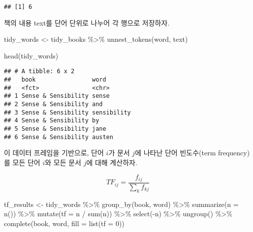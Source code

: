 \documentclass[
]{book}
\newenvironment{Shaded}{\begin{snugshade}}{\end{snugshade}}
\newcommand{\AttributeTok}[1]{\textcolor[rgb]{0.77,0.63,0.00}{#1}}
\newcommand{\DecValTok}[1]{\textcolor[rgb]{0.00,0.00,0.81}{#1}}
\newcommand{\FunctionTok}[1]{\textcolor[rgb]{0.00,0.00,0.00}{#1}}
\newcommand{\NormalTok}[1]{#1}
\newcommand{\OtherTok}[1]{\textcolor[rgb]{0.56,0.35,0.01}{#1}}
\newcommand{\SpecialCharTok}[1]{\textcolor[rgb]{0.00,0.00,0.00}{#1}}
\begin{document}
\begin{verbatim}
## [1] 6
\end{verbatim}

책의 내용 text를 단어 단위로 나누어 각 행으로 저장하자.

\begin{Shaded}
\begin{Highlighting}[]
\NormalTok{tidy\_words }\OtherTok{\textless{}{-}}\NormalTok{ tidy\_books }\SpecialCharTok{\%\textgreater{}\%} \FunctionTok{unnest\_tokens}\NormalTok{(word, text)}
  
\FunctionTok{head}\NormalTok{(tidy\_words)}
\end{Highlighting}
\end{Shaded}

\begin{verbatim}
## # A tibble: 6 x 2
##   book                word       
##   <fct>               <chr>      
## 1 Sense & Sensibility sense      
## 2 Sense & Sensibility and        
## 3 Sense & Sensibility sensibility
## 4 Sense & Sensibility by         
## 5 Sense & Sensibility jane       
## 6 Sense & Sensibility austen
\end{verbatim}

이 데이터 프레임을 기반으로, 단어 \(i\)가 문서 \(j\)에 나타난 단어 빈도수(term frequency)를 모든 단어 \(i\)와 모든 문서 \(j\)에 대해 계산하자.

\begin{equation*}
TF_{ij} = \frac{f_{ij}}{\sum_k f_{kj}}
\end{equation*}

\begin{Shaded}
\begin{Highlighting}[]
\NormalTok{tf\_results }\OtherTok{\textless{}{-}}\NormalTok{ tidy\_words }\SpecialCharTok{\%\textgreater{}\%}
  \FunctionTok{group\_by}\NormalTok{(book, word) }\SpecialCharTok{\%\textgreater{}\%}
  \FunctionTok{summarize}\NormalTok{(}\AttributeTok{n =} \FunctionTok{n}\NormalTok{()) }\SpecialCharTok{\%\textgreater{}\%}
  \FunctionTok{mutate}\NormalTok{(}\AttributeTok{tf =}\NormalTok{ n }\SpecialCharTok{/} \FunctionTok{sum}\NormalTok{(n)) }\SpecialCharTok{\%\textgreater{}\%}
  \FunctionTok{select}\NormalTok{(}\SpecialCharTok{{-}}\NormalTok{n) }\SpecialCharTok{\%\textgreater{}\%}
  \FunctionTok{ungroup}\NormalTok{() }\SpecialCharTok{\%\textgreater{}\%}
  \FunctionTok{complete}\NormalTok{(book, word, }\AttributeTok{fill =} \FunctionTok{list}\NormalTok{(}\AttributeTok{tf =} \DecValTok{0}\NormalTok{))}
\end{Highlighting}
\end{Shaded}
\end{document}
